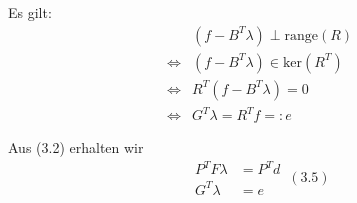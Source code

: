 Es gilt:
\begin{align*}
  & (f-B^T\lambda)\perp \text{range}(R) \\
  \Leftrightarrow & (f-B^T\lambda) \in \text{ker} (R^T) \\
  \Leftrightarrow & R^T(f-B^T\lambda)=0 \\
  \Leftrightarrow & G^T\lambda = R^Tf =:e
\end{align*}

Aus (3.2) erhalten wir
\[ \boxed{ \begin{aligned} P^TF\lambda &= P^Td \\ G^T\lambda &= e  \end{aligned}} \, (3.5) \]

